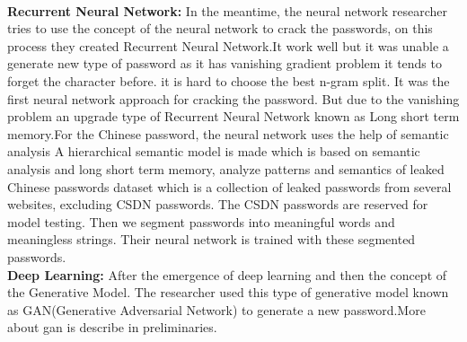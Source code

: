 \documentclass[runningheads]{llncs}
\begin{document}
 \\
 \newline
 \textbf{Recurrent Neural Network:}
 In the meantime, the neural network researcher tries to use the concept of the neural network to crack the passwords, on this process they created Recurrent Neural Network\cite{197243}.It work well but it was unable a generate new type of password as it has vanishing gradient problem it tends to forget the character before. it is hard to choose the best n-gram split. It was the first neural network approach for cracking the password. But due to the vanishing problem an upgrade type of Recurrent Neural Network known as Long short term memory\cite{DBLP:journals/corr/Lipton15}.For the Chinese password, the neural network uses the help of semantic analysis A hierarchical semantic model is made which is based on semantic analysis and long short term memory, analyze patterns and semantics of leaked Chinese passwords dataset which is a collection of leaked passwords from several websites, excluding CSDN passwords. The CSDN passwords are reserved for model testing. Then we segment passwords into meaningful words and meaningless strings. Their neural network is trained with these segmented passwords.\cite{10.1007/978-981-13-5913-2_6}
 \\
 \newline
 \textbf{Deep Learning:}
 After the emergence of deep learning and then the concept of the Generative Model. The researcher used this type of generative model known as GAN(Generative Adversarial Network)\cite{goodfellow2014generative} to generate a new password.More about gan is describe in preliminaries.
\newline
\\
\end{document}
